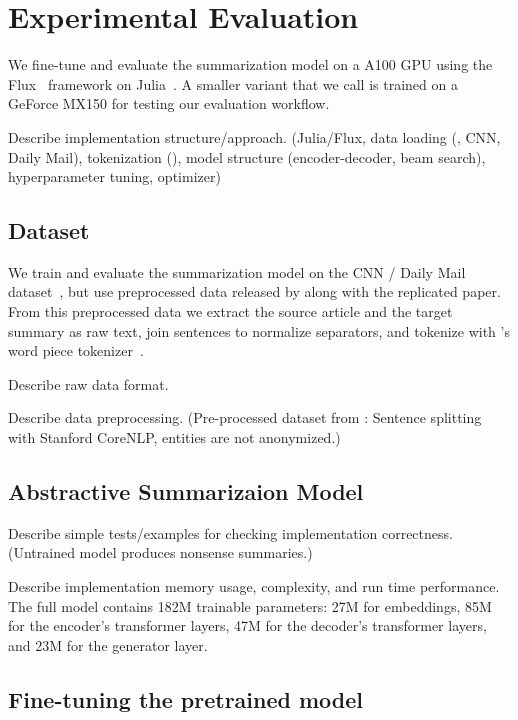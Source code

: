 \section{Experimental Evaluation} %

We fine-tune and evaluate the \BertSumAbs summarization model on a A100 GPU using the Flux~\cite{InnesSFGRJKPS2018} framework on Julia~\cite{BezansonEKS2017}.
A smaller variant that we call \TransformerAbsTiny is trained on a GeForce MX150 for testing our evaluation workflow.

Describe implementation structure/approach. (Julia/Flux, data loading (\Bert, CNN, Daily Mail), tokenization (\Bert), model structure (encoder-decoder, beam search), hyperparameter tuning, optimizer)

\subsection{Dataset}

We train and evaluate the summarization model on the CNN / Daily Mail dataset~\cite{HermannKGEKSB2015}, but use preprocessed data released by \citeauthor{LiuL2019} along with the replicated paper.
From this preprocessed data we extract the source article and the target summary as raw text, join sentences to normalize separators, and tokenize with \Bert's word piece tokenizer~\cite{DevlinCLT2019}.

Describe raw data format.

Describe data preprocessing. (Pre-processed dataset from \citeauthor{LiuL2019}: Sentence splitting  with Stanford CoreNLP, entities are not anonymized.)

\subsection{Abstractive Summarizaion Model}


Describe simple tests/examples for checking implementation correctness. (Untrained model produces nonsense summaries.)

Describe implementation memory usage, complexity, and run time performance.
The full \BertSumAbs model contains 182M trainable parameters: 27M for embeddings, 85M for the encoder's transformer layers, 47M for the decoder's transformer layers, and 23M for the generator layer.

\subsection{Fine-tuning the pretrained model}


